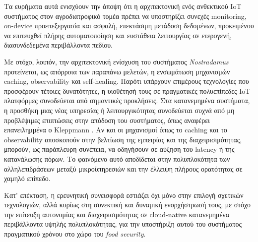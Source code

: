 Τα ευρήματα αυτά ενισχύουν την άποψη ότι η αρχιτεκτονική ενός ανθεκτικού IoT
συστήματος στον αγροδιατροφικό τομέα πρέπει να υποστηρίζει συνεχές monitoring,
on-device προεπεξεργασία και ασφαλή, επεκτάσιμη μετάδοση δεδομένων, προκειμένου
να επιτευχθεί πλήρης αυτοματοποίηση και ευστάθεια λειτουργίας σε ετερογενή,
διασυνδεδεμένα περιβάλλοντα πεδίου.

Με στόχο, λοιπόν, την αρχιτεκτονική ενίσχυση του συστήματος
\textit{Nostradamus} προτείνεται, ως απόρροια των παραπάνω μελετών, η
ενσωμάτωση μηχανισμών caching, observability και self-healing. Παρότι υπάρχουν
επιμέρους τεχνολογίες που προσφέρουν τέτοιες δυνατότητες, η υιοθέτησή τους σε
πραγματικές πολυεπίπεδες IoT πλατφόρμες συνοδεύεται από σημαντικές προκλήσεις.
Στα κατανεμημένα συστήματα, η προσθήκη μιας νέας υπηρεσίας ή λειτουργικότητας
συνοδεύεται συχνά από μη προβλέψιμες επιπτώσεις στην απόδοση του συστήματος,
όπως αναφέρει επανειλημμένα ο Kleppmann \cite{kleppmanndda}. Αν και οι
μηχανισμοί όπως το caching και το observability αποσκοπούν στην βελτίωση της
εμπειρίας και της διαχειρισιμότητας, μπορούν, ως παράπλευρη συνέπεια, να
οδηγήσουν σε αύξηση του latency ή της κατανάλωσης πόρων. Το φαινόμενο αυτό
αποδίδεται στην πολυπλοκότητα των αλληλεπιδράσεων μεταξύ μικροϋπηρεσιών και την
έλλειψη πλήρους ορατότητας σε χαμηλό επίπεδο.

Κατ’ επέκταση, η ερευνητική συνεισφορά εστιάζει όχι μόνο στην επιλογή σχετικών
τεχνολογιών, αλλά κυρίως στη συνεκτική και δυναμική ενορχήστρωσή τους, με στόχο
την επίτευξη αυτονομίας και διαχειρισιμότητας σε cloud-native κατανεμημένα
περιβάλλοντα υψηλής πολυπλοκότητας, για την υποστήριξη αυτού του συστήματος
πραγματικού χρόνου στο χώρο του \textit{food security}.
